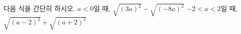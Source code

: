 다음 식을 간단히 하시오.
 $a<0$일 때, $\sqrt{(3a)^2}-\sqrt{(-8a)^2}$
 $-2<a<2$일 때, $\sqrt{(a-2)^2}+\sqrt{(a+2)^2}$
